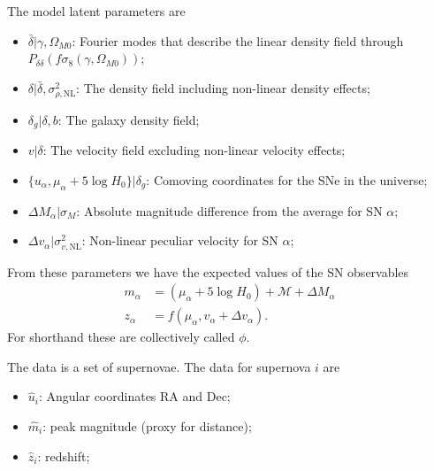\documentclass{article}
\begin{document}
The model latent parameters are
\begin{itemize}
\item $\bar{\delta} | \gamma, \Omega_{M0}$: Fourier modes that describe the linear density field through $P_{\delta \delta}(f\sigma_8(\gamma, \Omega_{M0}))$;
\item $\delta | \bar{\delta}, \sigma^2_{\rho,\text{NL}}$: The density field including non-linear density effects;
\item $\delta_g | \delta, b$: The galaxy density field;
\item $v | \delta$: The velocity field excluding non-linear velocity effects;
\item $\{u_\alpha, \mu_\alpha + 5\log{H_0} \}| \delta_g $: Comoving coordinates for the  SNe in the universe;
\item $\Delta M_\alpha | \sigma_M$: Absolute magnitude difference from the average for SN $\alpha$;
\item $\Delta v_\alpha| \sigma^2_{v,\text{NL}}$:  Non-linear peculiar velocity for SN $\alpha$;
\end{itemize}
From these parameters we have the expected values of the SN observables
\begin{align*}
m_\alpha &=  (\mu_\alpha + 5\log{H_0})+\mathcal{M} + \Delta M_\alpha\\
z_\alpha &= f(\mu_\alpha,v_\alpha+\Delta v_\alpha).
\end{align*}
For shorthand these are collectively called $\phi$.

The data is a set of supernovae.  The data for supernova $i$ are 
\begin{itemize}
\item $\hat{u}_i $: Angular coordinates RA and Dec;
\item $\hat{m}_i $: peak magnitude (proxy for distance);
\item $\hat{z}_i $: redshift;
\end{itemize}
\end{document}
